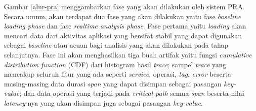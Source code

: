 Gambar \ref{alur-pra} menggambarkan fase yang akan dilakukan oleh sistem PRA. Secara umum, akan terdapat dua fase yang akan dilakukan yaitu fase \textit{baseline loading phase} dan fase \textit{realtime analysis phase}. Fase pertama yaitu \textit{loading} akan mencari data dari aktivitas aplikasi yang bersifat stabil yang dapat digunakan sebagai \textit{baseline} atau acuan bagi analisis yang akan dilakukan pada tahap selanjutnya. Fase ini akan menghasilkan tiga buah artifak yaitu fungsi \textit{cumulative distribution function} (CDF) dari histogram hasil \textit{trace}; sampel \textit{trace} yang mencakup seluruh fitur yang ada seperti \textit{service}, operasi, \textit{tag}, \textit{error} beserta masing-masing data durasi \textit{span} yang dapat disimpan sebagai pasangan \textit{key-value}; dan data operasi yang terjadi pada \textit{critical path} semua \textit{span} beserta nilai \textit{latency}-nya yang akan disimpan juga sebagai pasangan \textit{key-value}. 

